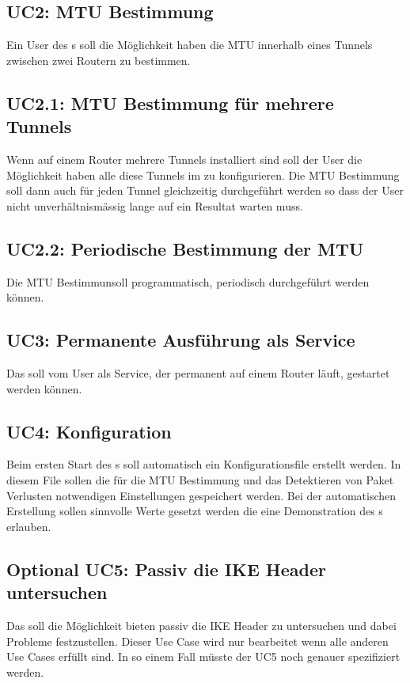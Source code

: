 \subsection{UC2: MTU Bestimmung}
Ein User des \tool{}s soll die Möglichkeit haben die \ac{MTU} innerhalb eines Tunnels zwischen zwei Routern zu bestimmen.

\subsection{UC2.1: MTU Bestimmung für mehrere Tunnels}
Wenn auf einem Router mehrere Tunnels installiert sind soll der User die Möglichkeit haben alle diese Tunnels im \tool{} zu konfigurieren. Die \ac{MTU} Bestimmung soll dann auch für jeden Tunnel gleichzeitig durchgeführt werden so dass der User nicht unverhältnismässig lange auf ein Resultat warten muss.

\subsection{UC2.2: Periodische Bestimmung der MTU}
Die \ac{MTU} Bestimmunsoll programmatisch, periodisch durchgeführt werden können.

\subsection{UC3: Permanente Ausführung als Service}
Das \tool{} soll vom User als Service, der permanent auf einem Router läuft, gestartet werden können.

\subsection{UC4: Konfiguration}
Beim ersten Start des \tool{}s soll automatisch ein Konfigurationsfile erstellt werden. In diesem File sollen die für die \ac{MTU} Bestimmung und das Detektieren von Paket Verlusten notwendigen Einstellungen gespeichert werden. Bei der automatischen Erstellung sollen sinnvolle Werte gesetzt werden die eine Demonstration des \tool{}s erlauben.

\subsection{Optional UC5: Passiv die IKE Header untersuchen}
Das \tool{} soll die Möglichkeit bieten passiv die \ac{IKE} Header zu untersuchen und dabei Probleme festzustellen. Dieser Use Case wird nur bearbeitet wenn alle anderen Use Cases erfüllt sind. In so einem Fall müsste der UC5 noch genauer spezifiziert werden.